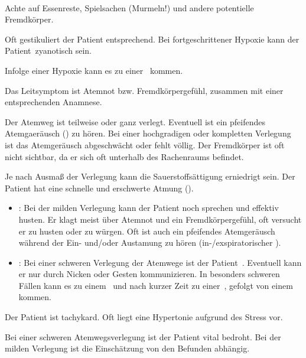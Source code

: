 
{\TxABCDE}
{~
\begin{ABCDEText}
  \item[\ABCDE{1}] Achte auf Essenreste, Spielsachen
  (Murmeln!) und andere potentielle Fremdkörper.
  \item[\ABCDE{2}] Oft gestikuliert der Patient
  entsprechend. Bei fortgeschrittener Hypoxie kann der
  Patient {\RedFlag}\,zyanotisch sein.
  \item[\ABCDE{3}] Infolge einer Hypoxie
  kann es zu einer {\RedFlag}\, kommen.
  \item[\ABCDE{4}] Das Leitsymptom ist Atemnot bzw.
  Fremdkörpergefühl, zusammen mit einer entsprechenden
  Anamnese.
  \item[\ABCDE{A}] Der Atemweg ist teilweise oder ganz
  verlegt. Eventuell ist ein pfeifendes Atemgaeräusch
  () zu hören. Bei einer hochgradigen
  oder kompletten Verlegung ist das Atemgeräusch
  abgeschwächt oder fehlt völlig. Der Fremdkörper ist oft
  nicht sichtbar, da er sich oft unterhalb des Rachenraums
  befindet. 
  \item[\ABCDE{B}] Je nach Ausmaß der Verlegung kann die
  Sauerstoffsättigung erniedrigt sein. Der Patient hat
  eine schnelle und erschwerte Atmung ().
  \begin{itemize}
  \item {}: Bei
  der milden Verlegung kann der Patient noch sprechen und effektiv husten. Er klagt
  meist über Atemnot und ein Fremdkörpergefühl, oft versucht er zu husten
  oder zu würgen. Oft ist auch ein pfeifendes Atemgeräusch
  während der Ein- und/oder Austamung zu hören
  (in-/exspiratorischer ).
  \item {}:
  Bei einer schweren Verlegung der Atemwege ist der Patient
  {\RedFlag}\,.
  Eventuell kann er nur durch Nic\-k\-en oder Gesten kommunizieren. In besonders
  schweren Fällen kann es zu einem
  {\RedFlag}\, und nach kurzer Zeit zu einer
  {\RedFlag}\,, gefolgt von einem  kommen.
\end{itemize}
  \item[\ABCDE{C}] Der Patient ist tachykard. Oft liegt eine Hypertonie aufgrund des
  Stress vor. 
  \item[\ABCDE{=}] Bei einer schweren Atemwegsverlegung ist
  der Patient vital bedroht. Bei der milden Verlegung ist
  die Einschätzung von den Befunden abhängig.
\end{ABCDEText}
}
